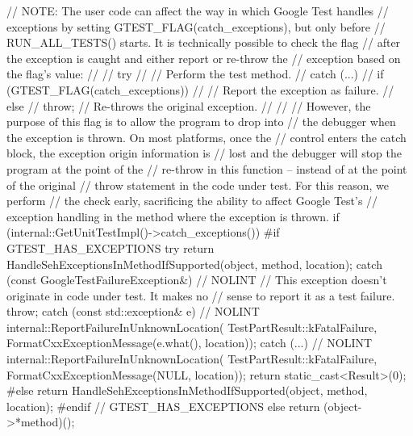 \begin{DoxyCode}
                                                          {
  // NOTE: The user code can affect the way in which Google Test handles
  // exceptions by setting GTEST_FLAG(catch_exceptions), but only before
  // RUN_ALL_TESTS() starts. It is technically possible to check the flag
  // after the exception is caught and either report or re-throw the
  // exception based on the flag's value:
  //
  // try {
  //   // Perform the test method.
  // } catch (...) {
  //   if (GTEST_FLAG(catch_exceptions))
  //     // Report the exception as failure.
  //   else
  //     throw;  // Re-throws the original exception.
  // }
  //
  // However, the purpose of this flag is to allow the program to drop into
  // the debugger when the exception is thrown. On most platforms, once the
  // control enters the catch block, the exception origin information is
  // lost and the debugger will stop the program at the point of the
  // re-throw in this function -- instead of at the point of the original
  // throw statement in the code under test.  For this reason, we perform
  // the check early, sacrificing the ability to affect Google Test's
  // exception handling in the method where the exception is thrown.
  if (internal::GetUnitTestImpl()->catch_exceptions()) {
#if GTEST_HAS_EXCEPTIONS
    try {
      return HandleSehExceptionsInMethodIfSupported(object, method, location);
    } catch (const GoogleTestFailureException&) {  // NOLINT
      // This exception doesn't originate in code under test. It makes no
      // sense to report it as a test failure.
      throw;
    } catch (const std::exception& e) {  // NOLINT
      internal::ReportFailureInUnknownLocation(
          TestPartResult::kFatalFailure,
          FormatCxxExceptionMessage(e.what(), location));
    } catch (...) {  // NOLINT
      internal::ReportFailureInUnknownLocation(
          TestPartResult::kFatalFailure,
          FormatCxxExceptionMessage(NULL, location));
    }
    return static_cast<Result>(0);
#else
    return HandleSehExceptionsInMethodIfSupported(object, method, location);
#endif  // GTEST_HAS_EXCEPTIONS
  } else {
    return (object->*method)();
  }
}
\end{DoxyCode}
